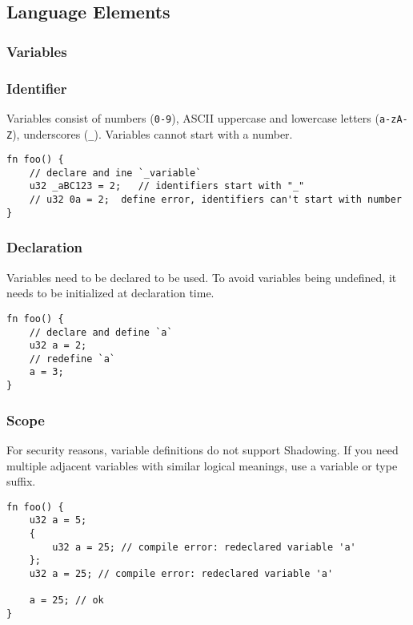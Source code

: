 \subsection{Language Elements}\label{section: ola-lang-language-elements}


\subsubsection{Variables}

\subsubsection*{Identifier}

Variables consist of numbers (\texttt{0-9}), ASCII uppercase and lowercase letters (\texttt{a-zA-Z}), underscores (\texttt{\_}).
Variables cannot start with a number.

\begin{lstlisting}
fn foo() {
    // declare and ine `_variable`
    u32 _aBC123 = 2;   // identifiers start with "_"
    // u32 0a = 2;  define error, identifiers can't start with number
}
\end{lstlisting}

\subsubsection*{Declaration}

Variables need to be declared to be used. To avoid variables being undefined, it needs to be initialized at declaration time. 

\begin{lstlisting}
fn foo() {
    // declare and define `a`
    u32 a = 2;
    // redefine `a`
    a = 3;
}
\end{lstlisting}

\subsubsection*{Scope}

For security reasons, variable definitions do not support Shadowing. 
If you need multiple adjacent variables with similar logical meanings, use a variable or type suffix.

\begin{lstlisting}
fn foo() {
    u32 a = 5;
    {        
        u32 a = 25; // compile error: redeclared variable 'a'
    };    
    u32 a = 25; // compile error: redeclared variable 'a'

    a = 25; // ok
}
\end{lstlisting}


